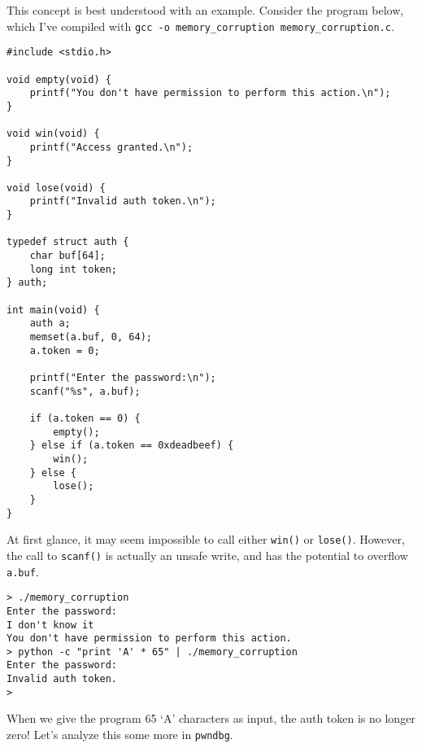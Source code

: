 \documentclass{article}
\begin{document}
This concept is best understood with an example. Consider the program below,
which I've compiled with \texttt{gcc -o memory\_corruption
memory\_corruption.c}.

\begin{lstlisting}
#include <stdio.h>

void empty(void) {
    printf("You don't have permission to perform this action.\n");
}

void win(void) {
    printf("Access granted.\n");
}

void lose(void) {
    printf("Invalid auth token.\n");
}

typedef struct auth {
    char buf[64];
    long int token;
} auth;

int main(void) {
    auth a;
    memset(a.buf, 0, 64);
    a.token = 0;

    printf("Enter the password:\n");
    scanf("%s", a.buf);

    if (a.token == 0) {
        empty();
    } else if (a.token == 0xdeadbeef) {
        win();
    } else {
        lose();
    }
}
\end{lstlisting}

At first glance, it may seem impossible to call either \texttt{win()} or
\texttt{lose()}. However, the call to \texttt{scanf()} is actually an unsafe
write, and has the potential to overflow \texttt{a.buf}.

\begin{lstlisting}
> ./memory_corruption 
Enter the password:
I don't know it
You don't have permission to perform this action.
> python -c "print 'A' * 65" | ./memory_corruption 
Enter the password:
Invalid auth token.
>
\end{lstlisting}

When we give the program 65 `A' characters as input, the auth token is no longer
zero! Let's analyze this some more in \texttt{pwndbg}.
\end{document}
